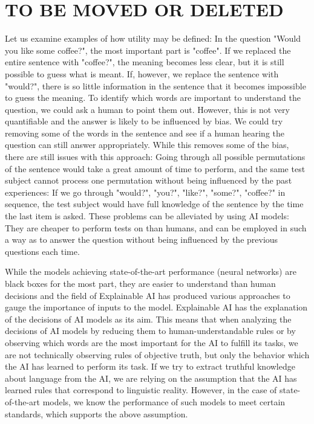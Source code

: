 \section{TO BE MOVED OR DELETED}
Let us examine examples of how utility may be defined:
In the question "Would you like some coffee?", the most important part is "coffee".
If we replaced the entire sentence with "coffee?", the meaning becomes less clear, but it is still possible to guess what is meant.
If, however, we replace the sentence with "would?", there is so little information in the sentence that it becomes impossible to guess the meaning.
To identify which words are important to understand the question, we could ask a human to point them out.
However, this is not very quantifiable and the answer is likely to be influenced by bias.
We could try removing some of the words in the sentence and see if a human hearing the question can still answer appropriately.
While this removes some of the bias, there are still issues with this approach:
Going through all possible permutations of the sentence would take a great amount of time to perform, and the same test subject cannot process one permutation without being influenced by the past experiences:
If we go through "would?", "you?", "like?", "some?", "coffee?" in sequence, the test subject would have full knowledge of the sentence by the time the last item is asked.
These problems can be alleviated by using AI models: They are cheaper to perform tests on than humans, and can be employed in such a way as to answer the question without being influenced by the previous questions each time.



While the models achieving state-of-the-art performance (neural networks) are black boxes for the most part, they are easier to understand than human decisions and the field of Explainable AI has produced various approaches to gauge the importance of inputs to the model.
Explainable AI has the explanation of the decisions of AI models as its aim.
This means that when analyzing the decisions of AI models by reducing them to human-understandable rules or by observing which words are the most important for the AI to fulfill its tasks, we are not technically observing rules of objective truth, but only the behavior which the AI has learned to perform its task.
If we try to extract truthful knowledge about language from the AI, we are relying on the assumption that the AI has learned rules that correspond to linguistic reality.
However, in the case of state-of-the-art models, we know the performance of such models to meet certain standards, which supports the above assumption.

